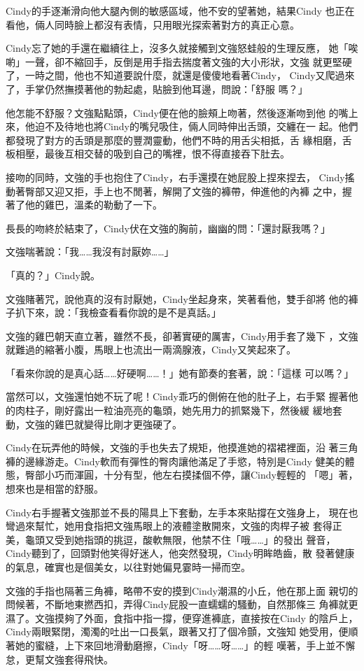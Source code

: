 Cindy的手逐漸滑向他大腿內側的敏感區域，他不安的望著她，結果Cindy
也正在看他，倆人同時臉上都沒有表情，只用眼光探索著對方的真正心意。

Cindy忘了她的手還在繼續往上，沒多久就接觸到文強怒蛙般的生理反應，
她「唉喲」一聲，卻不縮回手，反倒是用手指去揣度著文強的大小形狀，文強
就更堅硬了，一時之間，他也不知道要說什麼，就還是傻傻地看著Cindy，
Cindy又爬過來了，手掌仍然撫摸著他的勃起處，貼臉到他耳邊，問說：「舒服
嗎？」

他怎能不舒服？文強點點頭，Cindy便在他的臉頰上吻著，然後逐漸吻到他
的嘴上來，他迫不及待地也將Cindy的嘴兒吸住，倆人同時伸出舌頭，交纏在一
起。他們都發現了對方的舌頭是那麼的豐潤靈動，他們不時的用舌尖相抵，舌
緣相磨，舌板相壓，最後互相交替的吸到自己的嘴裡，恨不得直接吞下肚去。

接吻的同時，文強的手也抱住了Cindy，右手還摸在她屁股上捏來捏去，
Cindy搖動著臀部又迎又拒，手上也不閒著，解開了文強的褲帶，伸進他的內褲
之中，握著了他的雞巴，溫柔的勒動了一下。

長長的吻終於結束了，Cindy伏在文強的胸前，幽幽的問：「還討厭我嗎？」

文強喘著說：「我……我沒有討厭妳……」

「真的？」Cindy說。

文強賭著咒，說他真的沒有討厭她，Cindy坐起身來，笑著看他，雙手卻將
他的褲子扒下來，說：「我檢查看看你說的是不是真話。」

文強的雞巴朝天直立著，雖然不長，卻著實硬的厲害，Cindy用手套了幾下
，文強就難過的縮著小腹，馬眼上也流出一兩滴腺液，Cindy又笑起來了。

「看來你說的是真心話……好硬啊……！」她有節奏的套著，說：「這樣
可以嗎？」

當然可以，文強還怕她不玩了呢！Cindy乖巧的側俯在他的肚子上，右手緊
握著他的肉柱子，剛好露出一粒油亮亮的龜頭，她先用力的抓緊幾下，然後緩
緩地套動，文強的雞巴就變得比剛才更強硬了。

Cindy在玩弄他的時候，文強的手也失去了規矩，他摸進她的褶裙裡面，沿
著三角褲的邊緣游走。Cindy軟而有彈性的臀肉讓他滿足了手慾，特別是Cindy
健美的體態，臀部小巧而渾圓，十分有型，他左右摸揉個不停，讓Cindy輕輕的
「嗯」著，想來也是相當的舒服。

Cindy右手握著文強那並不長的陽具上下套動，左手本來貼撐在文強身上，
現在也彎過來幫忙，她用食指把文強馬眼上的液體塗散開來，文強的肉桿子被
套得正美，龜頭又受到她指頭的挑逗，酸軟無限，他禁不住「哦……」的發出
聲音，Cindy聽到了，回頭對他笑得好迷人，他突然發現，Cindy明眸皓齒，散
發著健康的氣息，確實也是個美女，以往對她偏見霎時一掃而空。

文強的手指也隔著三角褲，略帶不安的摸到Cindy潮濕的小丘，他在那上面
親切的問候著，不斷地東撚西扣，弄得Cindy屁股一直蠕蠕的騷動，自然那條三
角褲就更濕了。文強摸夠了外面，食指中指一撐，便穿進褲底，直接按在Cindy
的陰戶上，Cindy兩眼緊閉，濁濁的吐出一口長氣，跟著又打了個冷顫，文強知
她受用，便順著她的蜜縫，上下來回地滑動磨擦，Cindy「呀……呀……」的輕
嘆著，手上並不懈怠，更幫文強套得飛快。

